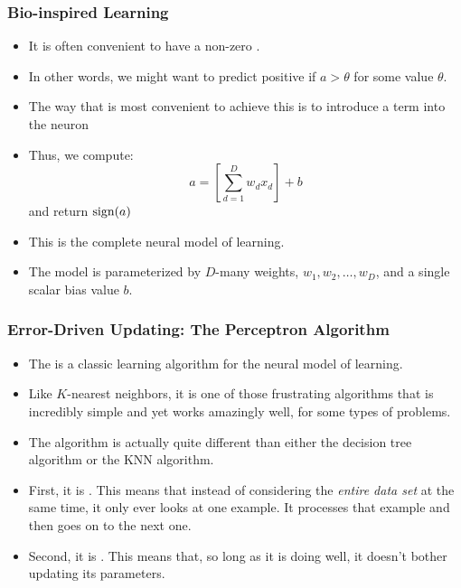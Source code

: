 \documentclass[trans]{beamer}
\begin{document}

\begin{frame}
  \frametitle{Bio-inspired Learning}
\begin{itemize}
\item
It is often convenient to have a non-zero . 
\item In
other words, we might want to predict positive if $a > \theta$ for some
value $\theta$. 
\item The way that is most convenient to achieve this is to
introduce a  term into the neuron
\item  Thus, we
compute:
\begin{equation} \label{eq:perc:sumbias}
a = \left[ \sum_{d=1}^D w_d x_d \right] + b
\end{equation}
and return $\textrm{sign}(a)$
\item
This is the complete neural model of learning.
\item  The model is
parameterized by $D$-many weights, $w_1, w_2, \dots, w_D$, and a
single scalar bias value $b$.
\end{itemize}
\end{frame}

\begin{frame}
  \frametitle{Error-Driven Updating: The Perceptron Algorithm}
\begin{itemize}
\item
The  is a classic learning algorithm for the
neural model of learning. 
\item Like $K$-nearest neighbors, it is one of
those frustrating algorithms that is incredibly simple and yet works
amazingly well, for some types of problems.
\item 
The algorithm is actually quite different than either the decision
tree algorithm or the KNN algorithm.  
\item First, it is .
This means that instead of considering the \emph{entire data set} at
the same time, it only ever looks at one example.  It processes that
example and then goes on to the next one.  
\item Second, it is
.  This means that, so long as it is doing well,
it doesn't bother updating its parameters.
\end{itemize}
\end{frame}
\end{document}
